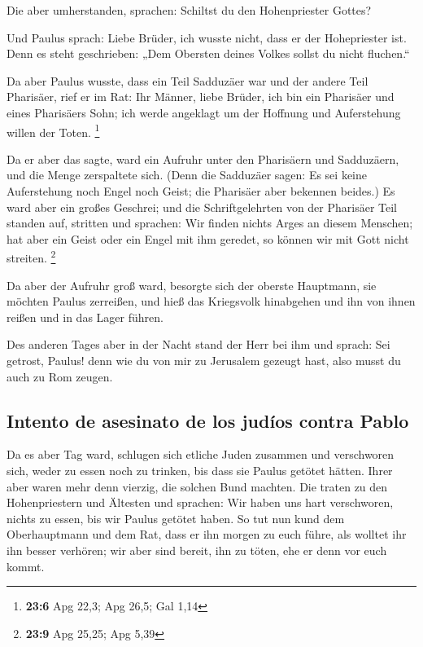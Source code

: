  Die aber umherstanden, sprachen: Schiltst du den
Hohenpriester Gottes?

 Und Paulus sprach: Liebe Brüder, ich wusste nicht, dass
er der Hohepriester ist. Denn es steht geschrieben: „Dem Obersten deines
Volkes sollst du nicht fluchen.``

 Da aber Paulus wusste, dass ein Teil Sadduzäer war und
der andere Teil Pharisäer, rief er im Rat: Ihr Männer, liebe Brüder, ich
bin ein Pharisäer und eines Pharisäers Sohn; ich werde angeklagt um der
Hoffnung und Auferstehung willen der Toten. \footnote{\textbf{23:6} Apg
  22,3; Apg 26,5; Gal 1,14}

 Da er aber das sagte, ward ein Aufruhr unter den
Pharisäern und Sadduzäern, und die Menge zerspaltete sich.
 (Denn die Sadduzäer sagen: Es sei keine Auferstehung noch
Engel noch Geist; die Pharisäer aber bekennen beides.)  Es
ward aber ein großes Geschrei; und die Schriftgelehrten von der
Pharisäer Teil standen auf, stritten und sprachen: Wir finden nichts
Arges an diesem Menschen; hat aber ein Geist oder ein Engel mit ihm
geredet, so können wir mit Gott nicht streiten. \footnote{\textbf{23:9}
  Apg 25,25; Apg 5,39}

 Da aber der Aufruhr groß ward, besorgte sich der oberste
Hauptmann, sie möchten Paulus zerreißen, und hieß das Kriegsvolk
hinabgehen und ihn von ihnen reißen und in das Lager führen.

 Des anderen Tages aber in der Nacht stand der Herr bei
ihm und sprach: Sei getrost, Paulus! denn wie du von mir zu Jerusalem
gezeugt hast, also musst du auch zu Rom zeugen.

\hypertarget{intento-de-asesinato-de-los-juduxedos-contra-pablo}{%
\subsection{Intento de asesinato de los judíos contra
Pablo}\label{intento-de-asesinato-de-los-juduxedos-contra-pablo}}

 Da es aber Tag ward, schlugen sich etliche Juden
zusammen und verschworen sich, weder zu essen noch zu trinken, bis dass
sie Paulus getötet hätten.  Ihrer aber waren mehr denn
vierzig, die solchen Bund machten.  Die traten zu den
Hohenpriestern und Ältesten und sprachen: Wir haben uns hart
verschworen, nichts zu essen, bis wir Paulus getötet haben.
 So tut nun kund dem Oberhauptmann und dem Rat, dass er
ihn morgen zu euch führe, als wolltet ihr ihn besser verhören; wir aber
sind bereit, ihn zu töten, ehe er denn vor euch kommt.

